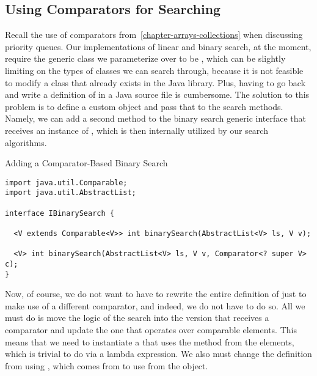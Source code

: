 \subsection*{Using Comparators for Searching}
Recall the use of comparators from~\ref{chapter-arrays-collections} when discussing priority queues. Our implementations of linear and binary search, at the moment, require the generic class we parameterize over to be , which can be slightly limiting on the types of classes we can search through, because it is not feasible to modify a class that already exists in the Java library. Plus, having to go back and write a definition of  in a Java source file is cumbersome. The solution to this problem is to define a custom  object and pass that to the search methods. Namely, we can add a second method to the binary search generic interface that receives an instance of , which is then internally utilized by our search algorithms. 


\begin{cl}[]{Adding a Comparator-Based Binary Search}
\begin{lstlisting}[language=MyJava]
import java.util.Comparable;
import java.util.AbstractList;

interface IBinarySearch {

  <V extends Comparable<V>> int binarySearch(AbstractList<V> ls, V v);

  <V> int binarySearch(AbstractList<V> ls, V v, Comparator<? super V> c);
}
\end{lstlisting}
\end{cl}

Now, of course, we do not want to have to rewrite the entire definition of  just to make use of a different comparator, and indeed, we do not have to do so. All we must do is move the logic of the search into the version that receives a comparator and update the one that operates over comparable elements. This means that we need to instantiate a  that uses the  method from the elements, which is trivial to do via a lambda expression. We also must change the definition from using , which comes from  to use  from the  object.

